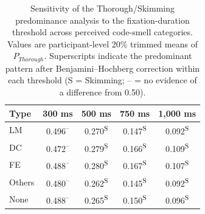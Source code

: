 \begin{table}[ht]
\centering
\caption{Sensitivity of the Thorough/Skimming predominance analysis to the
fixation-duration threshold across perceived code-smell categories. Values
are participant-level 20\% trimmed means of $P_{Thorough}$. Superscripts
indicate the predominant pattern after Benjamini--Hochberg correction
within each threshold (S = Skimming; -- = no evidence of a difference from 0.50).}
\label{tab:thorough_threshold_sensitivity}
\begin{tabular}{lcccc}
\toprule
Type & 300 ms & 500 ms & 750 ms & 1,000 ms \\
\midrule
LM     & 0.496\textsuperscript{--} & 0.270\textsuperscript{S} & 0.147\textsuperscript{S} & 0.092\textsuperscript{S} \\
DC     & 0.472\textsuperscript{--} & 0.279\textsuperscript{S} & 0.166\textsuperscript{S} & 0.109\textsuperscript{S} \\
FE     & 0.488\textsuperscript{--} & 0.280\textsuperscript{S} & 0.167\textsuperscript{S} & 0.107\textsuperscript{S} \\
Others & 0.480\textsuperscript{--} & 0.262\textsuperscript{S} & 0.145\textsuperscript{S} & 0.092\textsuperscript{S} \\
None   & 0.488\textsuperscript{--} & 0.265\textsuperscript{S} & 0.150\textsuperscript{S} & 0.096\textsuperscript{S} \\
\bottomrule
\end{tabular}
\end{table}
